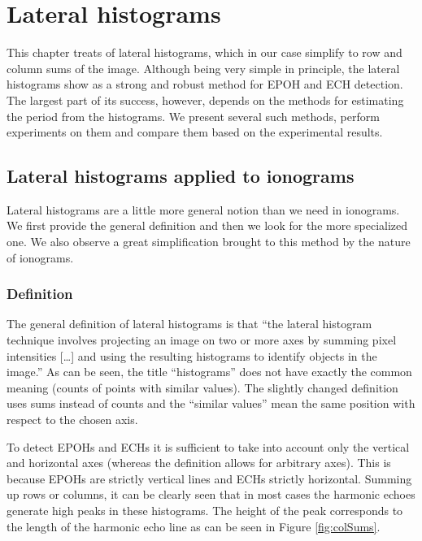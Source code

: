 \chapter{Lateral histograms}
This chapter treats of lateral histograms, which in our case simplify to row and column sums of the image. Although being very simple in principle, the lateral histograms show as a strong and robust method for EPOH and ECH detection. The largest part of its success, however, depends on the methods for estimating the period from the histograms. We present several such methods, perform experiments on them and compare them based on the experimental results.

\section{Lateral histograms applied to ionograms}
Lateral histograms are a little more general notion than we need in ionograms. We first provide the general definition and then we look for the more specialized one. We also observe a great simplification brought to this method by the nature of ionograms.

\subsection{Definition}
The general definition of lateral histograms is that ``the lateral histogram technique involves projecting an image on two or more axes by summing pixel intensities [\ldots] and using the resulting histograms to identify objects in the image.'' \citep{Davies2004} As can be seen, the title ``histograms'' does not have exactly the common meaning (counts of points with similar values). The slightly changed definition uses sums instead of counts and the ``similar values'' mean the same position with respect to the chosen axis.

To detect EPOHs and ECHs it is sufficient to take into account only the vertical and horizontal axes (whereas the definition allows for arbitrary axes). This is because EPOHs are strictly vertical lines and ECHs strictly horizontal. Summing up rows or columns, it can be clearly seen that in most cases the harmonic echoes generate high peaks in these histograms. The height of the peak corresponds to the length of the harmonic echo line as can be seen in Figure \ref{fig:colSums}. 

